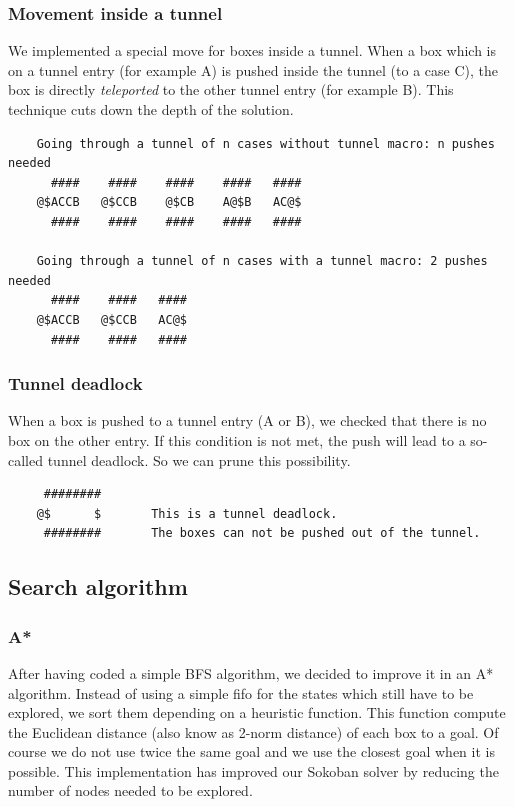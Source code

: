 \documentclass[a4paper,10pt]{article}
\begin{document}
	\subsubsection{Movement inside a tunnel}
	We implemented a special move for boxes inside a tunnel. 
	When a box which is on a tunnel entry (for example A) is pushed inside the tunnel (to a case C), the
	box is directly \textit{teleported} to the other tunnel entry (for example B).
	This technique cuts down the depth of the solution.

	\begin{verbatim}
	Going through a tunnel of n cases without tunnel macro: n pushes needed
	  ####    ####    ####    ####   ####
	@$ACCB   @$CCB    @$CB    A@$B   AC@$
	  ####    ####    ####    ####   ####

	Going through a tunnel of n cases with a tunnel macro: 2 pushes needed
	  ####    ####   ####
	@$ACCB   @$CCB   AC@$
	  ####    ####   ####

	\end{verbatim}

	\subsubsection{Tunnel deadlock}
	When a box is pushed to a tunnel entry (A or B), we checked that there is no box on the other entry.
	If this condition is not met, the push will lead to a so-called tunnel deadlock. 
	So we can prune this possibility.

	\begin{verbatim}
	 ########
	@$      $		This is a tunnel deadlock.
	 ########       The boxes can not be pushed out of the tunnel.
	\end{verbatim}

	\subsection{Search algorithm}
	\subsubsection{A*}
	After having coded a simple BFS algorithm, we decided to improve it in an A* algorithm. 
	Instead of using a simple fifo for the states which still have to be explored, we sort them depending on a heuristic function. 
	This function compute the Euclidean distance (also know as 2-norm distance) of each  box to a goal. 
	Of course we do not use twice the same goal and we use the closest goal when it is possible. 
	This implementation has improved our Sokoban solver by reducing the number of nodes needed to be explored.
\end{document}
